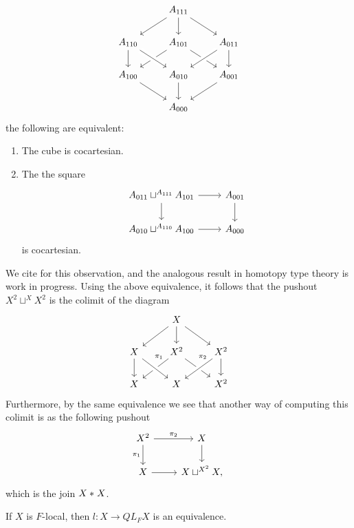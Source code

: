 \begin{eg}
\begin{equation*}
\begin{tikzcd}
& A_{111} \arrow[dl] \arrow[d] \arrow[dr] \\
A_{110} \arrow[d] & A_{101} \arrow[dl] \arrow[dr] & A_{011} \arrow[d] \\
A_{100} \arrow[dr] & A_{010} \arrow[d] \arrow[from=ul,crossing over] \arrow[from=ur,crossing over] & A_{001} \arrow[dl] \\
& A_{000}
\end{tikzcd}
\end{equation*}
the following are equivalent:
\begin{enumerate}
\item The cube is cocartesian.
\item The the square
\begin{equation*}
\begin{tikzcd}
A_{011}\sqcup^{A_{111}} A_{101} \arrow[r] \arrow[d] & A_{001} \arrow[d] \\
A_{010}\sqcup^{A_{110}} A_{100} \arrow[r] & A_{000}
\end{tikzcd}
\end{equation*}
is cocartesian.
\end{enumerate}
We cite \cite{Munson} for this observation, and the analogous result in homotopy type theory is work in progress. Using the above equivalence, it follows that the pushout $X^2\sqcup ^X X^2$ is the colimit of the diagram
\begin{equation*}
\begin{tikzcd}
& X \arrow[dl] \arrow[d] \arrow[dr] \\
X \arrow[d] & X^2 \arrow[dl,swap,"\pi_1" very near start] \arrow[dr] & X^2 \arrow[dl,crossing over,swap,"\pi_2" very near start] \arrow[d] \\
X & X \arrow[from=ul,crossing over] & X^2
\end{tikzcd}
\end{equation*}
Furthermore, by the same equivalence we see that another way of computing this colimit is as the following pushout
\begin{equation*}
\begin{tikzcd}
X^2 \arrow[r,"\pi_2"] \arrow[d,swap,"\pi_1"] & X \arrow[d] \\
X \arrow[r] & X\sqcup^{X^2} X,
\end{tikzcd}
\end{equation*}
which is the join ${X}\ast_{}{X}$.
\end{eg}

\begin{prp}
If $X$ is $F$-local, then $l:X\to QL_F X$ is an equivalence.
\end{prp}

